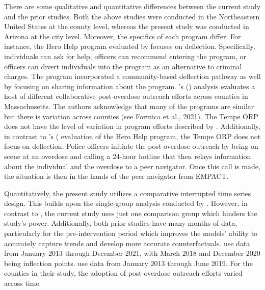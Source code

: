 There are some qualitative and quantitative differences between the current study and the prior studies. Both the above studies were conducted in the Northeastern United States at the county level, whereas the present study was conducted in Arizona at the city level. Moreover, the specifics of each program differ. For instance, the Hero Help program evaluated by \textcite{donnelly_law_2022} focuses on deflection. Specifically, individuals can ask for help, officers can recommend entering the program, or officers can divert individuals into the program as an alternative to criminal charges. The program incorporated a community-based deflection pathway as well by focusing on sharing information about the program. \citeauthor{xuan_association_2023}'s (\citeyear{xuan_association_2023}) analysis evaluates a host of different collaborative post-overdose outreach efforts across counties in Massachusetts. The authors acknowledge that many of the programs are similar but there is variation across counties (see Formica et al., 2021). The Tempe ORP does not have the level of variation in program efforts described by \textcite{xuan_association_2023}. Additionally, in contrast to \citeauthor{donnelly_law_2022}'s (\citeyear{donnelly_law_2022} evaluation of the Hero Help program, the Tempe ORP does not focus on deflection. Police officers initiate the post-overdose outreach by being on scene at an overdose and calling a 24-hour hotline that then relays information about the individual and the overdose to a peer navigator. Once this call is made, the situation is then in the hands of the peer navigator from EMPACT. 

Quantitatively, the present study utilizes a comparative interrupted time series design. This builds upon the single-group analysis conducted by \textcite{donnelly_law_2022}. However, in contrast to \textcite{xuan_association_2023}, the current study uses just one comparison group which hinders the study's power. Additionally, both prior studies have many months of data, particularly for the pre-intervention period which improves the models' ability to accurately capture trends and develop more accurate counterfactuals. \textcite{donnelly_law_2022} use data from January 2013 through December 2021, with March 2018 and December 2020 being inflection points. \textcite{xuan_association_2023} use data from January 2013 through June 2019. For the counties in their study, the adoption of post-overdose outreach efforts varied across time.

